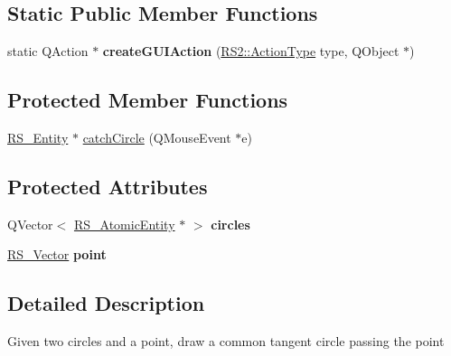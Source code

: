\subsection*{Static Public Member Functions}
\begin{DoxyCompactItemize}
\item 
\hypertarget{classRS__ActionDrawCircleTan2__1P_a0110db20be1e8027f053b09af25b3338}{static Q\-Action $\ast$ {\bfseries create\-G\-U\-I\-Action} (\hyperlink{classRS2_afe3523e0bc41fd637b892321cfc4b9d7}{R\-S2\-::\-Action\-Type} type, Q\-Object $\ast$)}\label{classRS__ActionDrawCircleTan2__1P_a0110db20be1e8027f053b09af25b3338}

\end{DoxyCompactItemize}
\subsection*{Protected Member Functions}
\begin{DoxyCompactItemize}
\item 
\hyperlink{classRS__Entity}{R\-S\-\_\-\-Entity} $\ast$ \hyperlink{classRS__ActionDrawCircleTan2__1P_a79bb2430adce59d0d0f3337c7968c65b}{catch\-Circle} (Q\-Mouse\-Event $\ast$e)
\end{DoxyCompactItemize}
\subsection*{Protected Attributes}
\begin{DoxyCompactItemize}
\item 
\hypertarget{classRS__ActionDrawCircleTan2__1P_a2541d507449d232d5284060ce6c07050}{Q\-Vector$<$ \hyperlink{classRS__AtomicEntity}{R\-S\-\_\-\-Atomic\-Entity} $\ast$ $>$ {\bfseries circles}}\label{classRS__ActionDrawCircleTan2__1P_a2541d507449d232d5284060ce6c07050}

\item 
\hypertarget{classRS__ActionDrawCircleTan2__1P_ae4ba8bd6b034b8e72dfd727d1a5e017f}{\hyperlink{classRS__Vector}{R\-S\-\_\-\-Vector} {\bfseries point}}\label{classRS__ActionDrawCircleTan2__1P_ae4ba8bd6b034b8e72dfd727d1a5e017f}

\end{DoxyCompactItemize}


\subsection{Detailed Description}
Given two circles and a point, draw a common tangent circle passing the point

